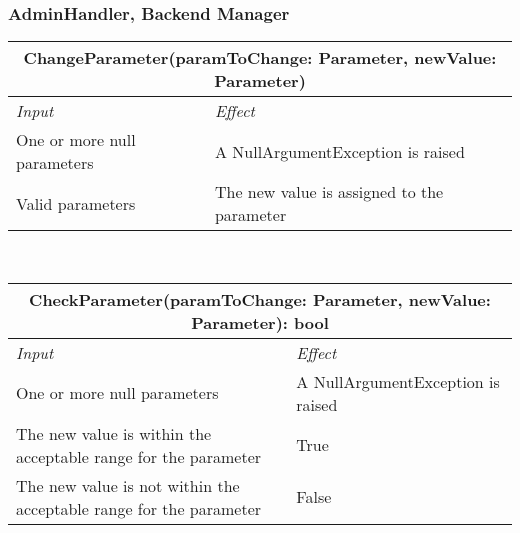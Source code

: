 		\subsubsection*{AdminHandler, Backend Manager}
			\begin{tabular}{ |l|l| }
				\hline
				\multicolumn{2}{|c|}{ChangeParameter(paramToChange: Parameter, newValue: Parameter)}\\
				\hline
				\textit{Input} & \textit{Effect}\\ \hline
				One or more null parameters & A NullArgumentException is raised\\ \hline
				Valid parameters & The new value is assigned to the parameter\\ \hline
			\end{tabular}
			\\
			\begin{tabular}{ |l|l| }
				\hline
				\multicolumn{2}{|c|}{CheckParameter(paramToChange: Parameter, newValue: Parameter): bool}\\
				\hline
				\textit{Input} & \textit{Effect}\\ \hline
				One or more null parameters & A NullArgumentException is raised\\ \hline
				The new value is within the acceptable range for the parameter & True\\ \hline
				The new value is not within the acceptable range for the parameter & False\\ \hline
			\end{tabular}
			\\